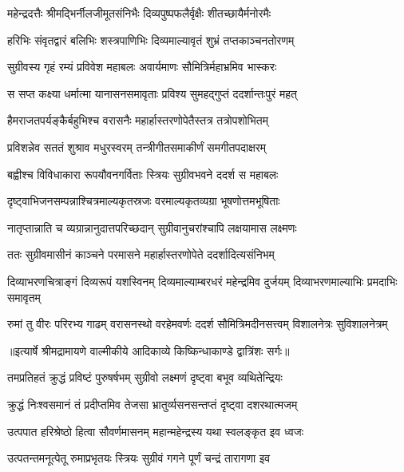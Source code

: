 \twolineshloka
{महेन्द्रदत्तैः श्रीमद्भिर्नीलजीमूतसंनिभैः}
{दिव्यपुष्पफलैर्वृक्षैः शीतच्छायैर्मनोरमैः} %

\twolineshloka
{हरिभिः संवृतद्वारं बलिभिः शस्त्रपाणिभिः}
{दिव्यमाल्यावृतं शुभ्रं तप्तकाञ्चनतोरणम्} %

\twolineshloka
{सुग्रीवस्य गृहं रम्यं प्रविवेश महाबलः}
{अवार्यमाणः सौमित्रिर्महाभ्रमिव भास्करः} %

\twolineshloka
{स सप्त कक्ष्या धर्मात्मा यानासनसमावृताः}
{प्रविश्य सुमहद्गुप्तं ददर्शान्तःपुरं महत्} %

\twolineshloka
{हैमराजतपर्यङ्कैर्बहुभिश्च वरासनैः}
{महार्हास्तरणोपेतैस्तत्र तत्रोपशोभितम्} %

\twolineshloka
{प्रविशन्नेव सततं शुश्राव मधुरस्वरम्}
{तन्त्रीगीतसमाकीर्णं समगीतपदाक्षरम्} %

\twolineshloka
{बह्वीश्च विविधाकारा रूपयौवनगर्विताः}
{स्त्रियः सुग्रीवभवने ददर्श स महाबलः} %

\twolineshloka
{दृष्ट्वाभिजनसम्पन्नाश्चित्रमाल्यकृतस्रजः}
{वरमाल्यकृतव्यग्रा भूषणोत्तमभूषिताः} %

\twolineshloka
{नातृप्तान्नाति च व्यग्रान्नानुदात्तपरिच्छदान्}
{सुग्रीवानुचरांश्चापि लक्षयामास लक्ष्मणः} %

\twolineshloka
{ततः सुग्रीवमासीनं काञ्चने परमासने}
{महार्हास्तरणोपेते ददर्शादित्यसंनिभम्} %

\threelineshloka
{दिव्याभरणचित्राङ्गं दिव्यरूपं यशस्विनम्}
{दिव्यमाल्याम्बरधरं महेन्द्रमिव दुर्जयम्}
{दिव्याभरणमाल्याभिः प्रमदाभिः समावृतम्} %

\fourlineindentedshloka
{रुमां तु वीरः परिरभ्य गाढम्}
{वरासनस्थो वरहेमवर्णः}
{ददर्श सौमित्रिमदीनसत्त्वम्}
{विशालनेत्रः सुविशालनेत्रम्} %


{॥इत्यार्षे श्रीमद्रामायणे वाल्मीकीये आदिकाव्ये किष्किन्धाकाण्डे द्वात्रिंशः सर्गः॥}


\twolineshloka
{तमप्रतिहतं क्रुद्धं प्रविष्टं पुरुषर्षभम्}
{सुग्रीवो लक्ष्मणं दृष्ट्वा बभूव व्यथितेन्द्रियः} %

\twolineshloka
{क्रुद्धं निःश्वसमानं तं प्रदीप्तमिव तेजसा}
{भ्रातुर्व्यसनसन्तप्तं दृष्ट्वा दशरथात्मजम्} %

\twolineshloka
{उत्पपात हरिश्रेष्ठो हित्वा सौवर्णमासनम्}
{महान्महेन्द्रस्य यथा स्वलङ्कृत इव ध्वजः} %

\twolineshloka
{उत्पतन्तमनूत्पेतू रुमाप्रभृतयः स्त्रियः}
{सुग्रीवं गगने पूर्णं चन्द्रं तारागणा इव} %

